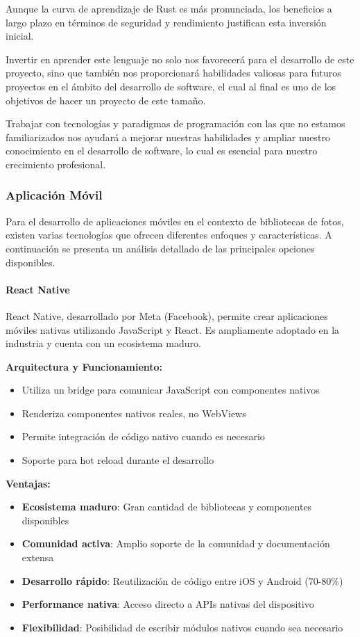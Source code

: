 Aunque la curva de aprendizaje de Rust es más pronunciada, los beneficios a largo plazo en términos de seguridad y rendimiento justifican esta inversión inicial.

Invertir en aprender este lenguaje no solo nos favorecerá para el desarrollo de este proyecto, sino que también nos proporcionará habilidades valiosas para futuros proyectos en el ámbito del desarrollo de software, el cual al final es uno de los objetivos de hacer un proyecto de este tamaño.

Trabajar con tecnologías y paradigmas de programación con las que no estamos familiarizados nos ayudará a mejorar nuestras habilidades y ampliar nuestro conocimiento en el desarrollo de software, lo cual es esencial para nuestro crecimiento profesional.

\subsubsection{Aplicación Móvil}

Para el desarrollo de aplicaciones móviles en el contexto de bibliotecas de fotos, existen varias tecnologías que ofrecen diferentes enfoques y características. A continuación se presenta un análisis detallado de las principales opciones disponibles.

\paragraph{React Native}

React Native, desarrollado por Meta (Facebook), permite crear aplicaciones móviles nativas utilizando JavaScript y React. Es ampliamente adoptado en la industria y cuenta con un ecosistema maduro.

\textbf{Arquitectura y Funcionamiento:}
\begin{itemize}
    \item Utiliza un \gls{bridge} para comunicar JavaScript con componentes nativos
    \item Renderiza componentes nativos reales, no WebViews
    \item Permite integración de código nativo cuando es necesario
    \item Soporte para hot reload durante el desarrollo
\end{itemize}

\textbf{Ventajas:}
\begin{itemize}
    \item \textbf{Ecosistema maduro}: Gran cantidad de bibliotecas y componentes disponibles
    \item \textbf{Comunidad activa}: Amplio soporte de la comunidad y documentación extensa
    \item \textbf{Desarrollo rápido}: Reutilización de código entre iOS y Android (70-80\%)
    \item \textbf{Performance nativa}: Acceso directo a APIs nativas del dispositivo
    \item \textbf{Flexibilidad}: Posibilidad de escribir módulos nativos cuando sea necesario
\end{itemize}

